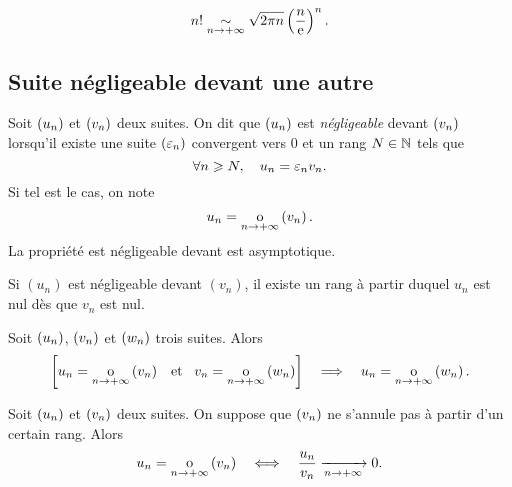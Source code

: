 \documentclass{magnoliaold}
\begin{document}




\begin{proposition}[nom={{\sc Stirling}}]
\[n!\underset{n\rightarrow +\infty}{\sim}\sqrt{2\pi n}\left(\frac{n}{{\rm e}}\right)^n.\]
\end{proposition}

\subsection{Suite négligeable devant une autre}

\begin{definition}[utile=-3]
Soit $\left(u_n\right)$ et $\left(v_n\right)$ deux suites. On dit que $\left(u_n\right)$ est \emph{négligeable}
devant $\left(v_n\right)$ lorsqu'il existe une suite $\left(\varepsilon_n\right)$ convergent vers 0 et
un rang $N\in\mathbb{N}$ tels que
\[\forall n\geqslant N ,\quad u_n=\varepsilon_n v_n.\]
Si tel est le cas, on note
\[u_n=\underset{n \rightarrow +\infty}{\text{o}}\left(v_n\right).\]
La propriété \og est négligeable devant \fg est asymptotique.
\end{definition}

\begin{remarqueUnique}
\remarque Si $(u_n)$ est négligeable devant $(v_n)$, il existe un rang à partir
  duquel $u_n$ est nul dès que $v_n$ est nul.
\end{remarqueUnique}

\begin{proposition}[utile=-3]
Soit $\left(u_n\right)$, $\left(v_n\right)$ et $\left(w_n\right)$ trois suites. Alors
\[\left[u_n=\underset{n \rightarrow +\infty}{\text{o}}\left(v_n\right) \quad\!\text{et}\quad\! v_n=\underset{n \rightarrow +\infty}{\text{o}}\left(w_n\right)\right]
  \quad\Longrightarrow\quad u_n=\underset{n \rightarrow +\infty}{\text{o}}\left(w_n\right).\]
\end{proposition}

\begin{proposition}[utile=-3]
Soit $\left(u_n\right)$ et $\left(v_n\right)$ deux suites. On suppose que $\left(v_n\right)$ ne s'annule pas
à partir d'un certain rang. Alors
\[u_n=\underset{n \rightarrow +\infty}{\text{o}}\left(v_n\right) \quad\Longleftrightarrow\quad
  \frac{u_n}{v_n}\xrightarrow[n\rightarrow +\infty]{} 0.\]
\end{proposition}
\end{document}
